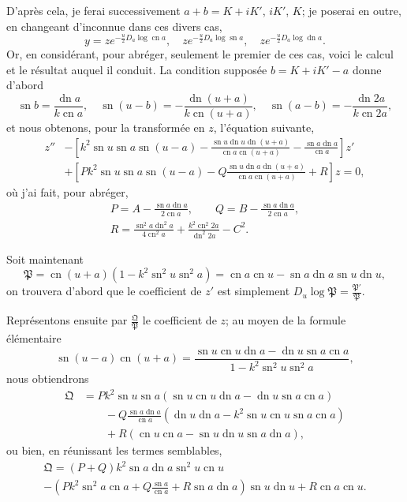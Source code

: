 \documentclass[11pt,leqno,oneside,letterpaper]{book}[2005/09/16]
\DeclareMathOperator{\sn}{sn}
\DeclareMathOperator{\cn}{cn}
\DeclareMathOperator{\dn}{dn}
\begin{document}
D'apr\`es cela, je ferai successivement $a + b = K + iK'$, $iK'$, $K$; je poserai
en outre, en changeant d'inconnue dans ces divers cas,
\[
y =
  ze^{-\frac{u}{2}D_a \log \cn a}, \quad
  ze^{-\frac{u}{2}D_a \log \sn a}, \quad
  ze^{-\frac{u}{2}D_a \log \dn a}.
\]
Or, en consid\'erant, pour abr\'eger, seulement le premier de ces cas,
voici le calcul et le r\'esultat auquel il conduit. La condition suppos\'ee
$b = K + iK' -a$ donne d'abord
\[
\sn     b =  \frac{\dn a}{k\cn a}    , \quad
\sn (u-b) = -\frac{\dn(u+a)}{k\cn (u+a)}, \quad
\sn (a-b) = -\frac{\dn 2a}{k\cn 2a},
\]
et nous obtenons, pour la transform\'ee en $z$, l'\'equation suivante,
\[
\begin{split}
z'' &- \left[ k^2 \sn u \sn a \sn(u-a)
              - \frac{\sn u\dn u\dn(u+a)}{\cn a\cn(u+a)}
              - \frac{\sn a\dn a}{\cn a} \right] z' \\
    &+ \left[ Pk^2 \sn u \sn a \sn(u-a)
              - Q\frac{\sn u\dn a\dn(u+a)}{\cn a\cn(u+a)}
              + R \right] z = 0,
\end{split}
\]
o\`u j'ai fait, pour abr\'eger,
\begin{gather*}
P = A - \frac{\sn a\dn a}{2\cn a}, \qquad
Q = B - \frac{\sn a\dn a}{2\cn a}, \\
R = \frac{\sn^2 a \dn^2 a}{4\cn^2 a} + \frac{k^2\cn^2 2a}{\dn^2 2a} - C^2.
\end{gather*}

Soit maintenant
\[
\mathfrak{P} = \cn(u+a) \left( 1-k^2\sn^2 u \sn^2 a \right)
  = \cn a \cn u - \sn a \dn a \sn u \dn u,
\]
on trouvera d'abord que le coefficient de $z'$ est simplement $D_u \log \mathfrak{P} = \frac{\mathfrak{P'}}{\mathfrak{P}}$.

Repr\'esentons ensuite par $\frac{\mathfrak{Q}}{\mathfrak{P}}$ le coefficient de $z$; au moyen de la formule
\'el\'ementaire
\[
\sn(u-a)\cn(u+a) = \frac{\sn u\cn u\dn a - \dn u\sn a\cn a}
                        {1 - k^2\sn^2 u\sn^2 a},
\]
nous obtiendrons
\[
\begin{split}
\mathfrak{Q} &= P k^2 \sn u \sn a \left(\sn u \cn u \dn a - \dn u \sn a \cn a \right) \\
             &\qquad {} - Q\frac{\sn a\dn a}{\cn a} \left(\dn u\dn a - k^2\sn u\cn u\sn a\cn a \right)\\
             &\qquad {} + R \left(\cn u \cn a - \sn u \dn u \sn a \dn a \right),
\end{split}
\]
ou bien, en r\'eunissant les termes semblables,
\begin{multline*}
\mathfrak{Q} = (P+Q) k^2 \sn a \dn a \sn^2 u \cn u \\
     -\left( Pk^2 \sn^2 a \cn a + Q\frac{\sn a}{\cn a} + R\sn a\dn a \right)
        \sn u \dn u + R \cn a \cn u.
\end{multline*}
\end{document}
